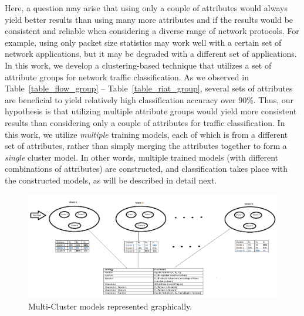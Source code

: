 \documentclass[conference]{IEEEtran}
\begin{document}
Here, a question may arise that using only a couple of attributes would always yield better results than using many more attributes and if the results would be consistent and reliable when considering a diverse range of network protocols.
For example, using only packet size statistics may work well with a certain set of network applications, but it may be degraded with a different set of applications. 
In this work, we develop a clustering-based technique that utilizes a set of attribute groups for network traffic classification.
As we observed in Table~\ref{table_flow_group} -- Table~\ref{table_riat_group}, several sets of attributes are beneficial to yield relatively high classification accuracy over 90\%.
Thus, our hypothesis is that utilizing multiple attribute groups would yield more consistent results than considering only a couple of attributes for traffic classification.
In this work, we utilize \emph{multiple} training models, each of which is from a different set of attributes, rather than simply merging the attributes together to form a \emph{single} cluster model.
In other words, multiple trained models (with different combinations of attributes) are constructed, %
and classification takes place with the constructed models, as will be described in detail next.

\begin{figure}[!t]
	\centering
	\includegraphics[width=2\columnwidth]{multi_cluster_pictorial.png}
	\caption{Multi-Cluster models represented graphically.}
	\label{fig:multi_cluster_models}
\end{figure}
\end{document}
